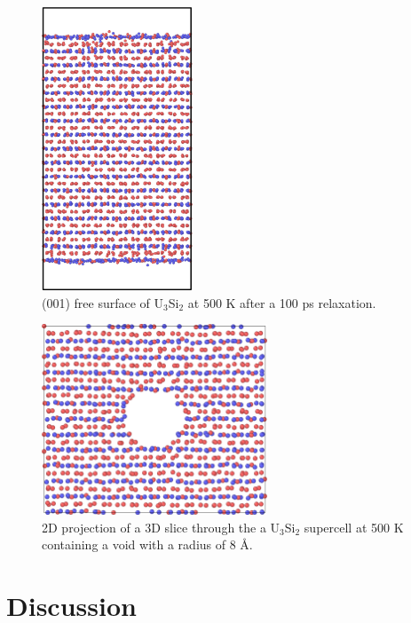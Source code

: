 \documentclass[review]{elsarticle}
\begin{document}
\begin{figure}[bt]
	\centering
	\includegraphics[width=0.4\textwidth]{001surface500k.png}
    \caption{(001) free surface of U$_{3}$Si$_{2}$ at 500 K after a 100 ps relaxation. }\label{fig:ben8}
\end{figure}

\begin{figure}[bt]
	\centering
	\includegraphics[width=0.6\textwidth]{void2.png}
    \caption{2D projection of a 3D slice through the a U$_{3}$Si$_{2}$ supercell at 500 K containing a void with a radius of 8 {\AA}.  }\label{fig:void}
\end{figure}

\FloatBarrier
\clearpage

\section{Discussion}
\end{document}
